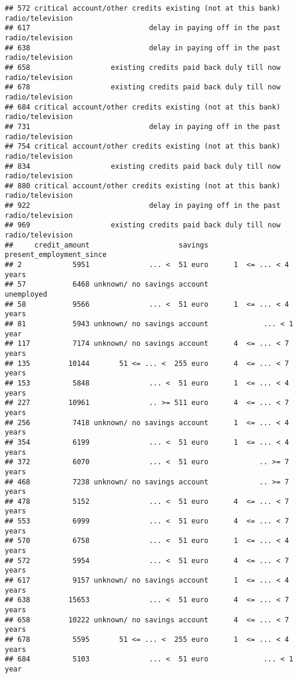 \documentclass[
]{article}
\begin{document}
\begin{verbatim}
## 572 critical account/other credits existing (not at this bank) radio/television
## 617                            delay in paying off in the past radio/television
## 638                            delay in paying off in the past radio/television
## 658                   existing credits paid back duly till now radio/television
## 678                   existing credits paid back duly till now radio/television
## 684 critical account/other credits existing (not at this bank) radio/television
## 731                            delay in paying off in the past radio/television
## 754 critical account/other credits existing (not at this bank) radio/television
## 834                   existing credits paid back duly till now radio/television
## 880 critical account/other credits existing (not at this bank) radio/television
## 922                            delay in paying off in the past radio/television
## 969                   existing credits paid back duly till now radio/television
##     credit_amount                     savings present_employment_since
## 2            5951              ... <  51 euro      1  <= ... < 4 years
## 57           6468 unknown/ no savings account               unemployed
## 58           9566              ... <  51 euro      1  <= ... < 4 years
## 81           5943 unknown/ no savings account             ... < 1 year
## 117          7174 unknown/ no savings account      4  <= ... < 7 years
## 135         10144       51 <= ... <  255 euro      4  <= ... < 7 years
## 153          5848              ... <  51 euro      1  <= ... < 4 years
## 227         10961              .. >= 511 euro      4  <= ... < 7 years
## 256          7418 unknown/ no savings account      1  <= ... < 4 years
## 354          6199              ... <  51 euro      1  <= ... < 4 years
## 372          6070              ... <  51 euro            .. >= 7 years
## 468          7238 unknown/ no savings account            .. >= 7 years
## 478          5152              ... <  51 euro      4  <= ... < 7 years
## 553          6999              ... <  51 euro      4  <= ... < 7 years
## 570          6758              ... <  51 euro      1  <= ... < 4 years
## 572          5954              ... <  51 euro      4  <= ... < 7 years
## 617          9157 unknown/ no savings account      1  <= ... < 4 years
## 638         15653              ... <  51 euro      4  <= ... < 7 years
## 658         10222 unknown/ no savings account      4  <= ... < 7 years
## 678          5595       51 <= ... <  255 euro      1  <= ... < 4 years
## 684          5103              ... <  51 euro             ... < 1 year

\end{verbatim}
\end{document}

